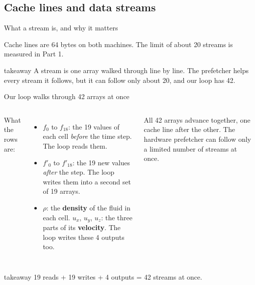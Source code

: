 \documentclass[aspectratio=169,10pt,t]{beamer}
\newcommand{\term}[1]{\textcolor{psblue!85!black}{\textbf{#1}}} %
\newcommand{\takeaway}[1]{\par\vfill
  \begin{beamercolorbox}[wd=\textwidth,sep=4pt,rounded=true]{takeaway}
    \small #1
  \end{beamercolorbox}}
\begin{document}
\subsection{Cache lines and data streams}
\begin{frame}{What a stream is, and why it matters}
  \vspace{2mm}
  \centering

  \vspace{1mm}
  \raggedright
  {\scriptsize\color{psgray}Cache lines are 64 bytes on both machines. The limit of about 20 streams is measured in
  Part 1.\par}
  \takeaway{A stream is one array walked through line by line. The prefetcher helps every stream it follows, but
    it can follow only about 20, and our loop has 42.}
\end{frame}

\begin{frame}{Our loop walks through 42 arrays at once}
  \begin{columns}[T,onlytextwidth]
    \vspace{1mm}
    \centering
    \vspace{1mm}
    {\small What the rows are:\par}
    \vspace{1mm}
    \begin{itemize}\small
      \item $f_0$ to $f_{18}$: the 19 values of each cell \emph{before} the time step. The loop reads them.
      \item $f'_0$ to $f'_{18}$: the 19 new values \emph{after} the step. The loop writes them into a second set
            of 19 arrays.
      \item $\rho$: the \term{density} of the fluid in each cell. $u_x$, $u_y$, $u_z$: the three parts of its
            \term{velocity}. The loop writes these 4 outputs too.
    \end{itemize}
    \vspace{1mm}
    {\small All 42 arrays advance together, one cache line after the other. The hardware prefetcher can follow
    only a limited number of streams at once.\par}
  \end{columns}
  \takeaway{19 reads + 19 writes + 4 outputs = 42 streams at once.}
\end{frame}
\end{document}
